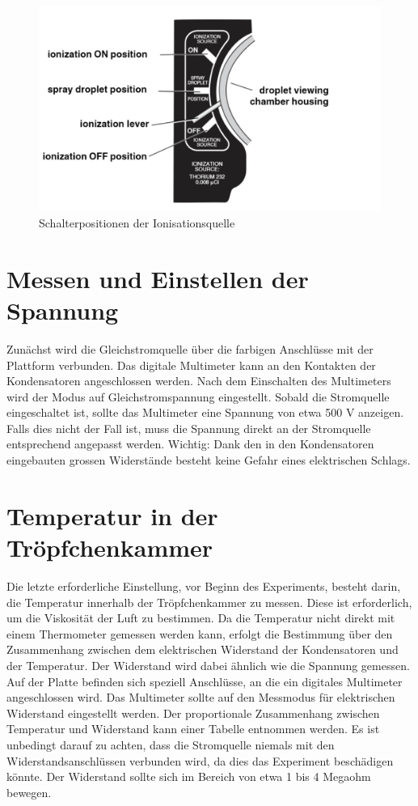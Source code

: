 \begin{figure}[ht]
	\begin{center}
		\includegraphics[scale=0.5]{bilder/pdf/Schalterfunktionen.pdf}
		\caption{Schalterpositionen der Ionisationsquelle \parencite[6]{instructionManualHalogen}}
		\label{fig:Schalterpositionen}
	\end{center}
\end{figure}

\section{Messen und Einstellen der Spannung}\label{sec:spannung}
Zunächst wird die Gleichstromquelle über die farbigen Anschlüsse mit der Plattform verbunden. Das digitale Multimeter kann an den Kontakten der Kondensatoren angeschlossen werden. Nach dem Einschalten des Multimeters wird der Modus auf Gleichstromspannung eingestellt. Sobald die Stromquelle eingeschaltet ist, sollte das Multimeter eine Spannung von etwa 500 V anzeigen. Falls dies nicht der Fall ist, muss die Spannung direkt an der Stromquelle entsprechend angepasst werden. Wichtig: Dank den in den Kondensatoren eingebauten grossen Widerstände besteht keine Gefahr eines elektrischen Schlags.

\section{Temperatur in der Tröpfchenkammer}\label{sec:Temperatur}
Die letzte erforderliche Einstellung, vor Beginn des Experiments, besteht darin, die Temperatur innerhalb der Tröpfchenkammer zu messen. Diese ist erforderlich, um die Viskosität der Luft zu bestimmen. Da die Temperatur nicht direkt mit einem Thermometer gemessen werden kann, erfolgt die Bestimmung über den Zusammenhang zwischen dem elektrischen Widerstand der Kondensatoren und der Temperatur. Der Widerstand wird dabei ähnlich wie die Spannung gemessen. Auf der Platte befinden sich speziell Anschlüsse, an die ein digitales Multimeter angeschlossen wird. Das Multimeter sollte auf den Messmodus für elektrischen Widerstand eingestellt werden. Der proportionale Zusammenhang zwischen Temperatur und Widerstand kann einer Tabelle entnommen werden. Es ist unbedingt darauf zu achten, dass die Stromquelle niemals mit den Widerstandsanschlüssen verbunden wird, da dies das Experiment beschädigen könnte. Der Widerstand sollte sich im Bereich von etwa 1 bis 4 Megaohm bewegen.


